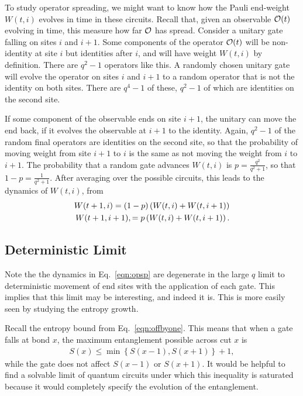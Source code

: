 
To study operator spreading, we might want to know how the Pauli end-weight $W(t,i)$ evolves in time in these circuits. Recall that, given an observable $\cal{O}(t)$ evolving in time, this measure how far $\cal{O}$ has spread. Consider a unitary gate falling on sites $i$ and $i+1$. Some components of the operator $\cal{O}(t)$ will be non-identity at site $i$ but identities after $i$, and will have weight $W(t, i)$ by definition. There are $q^2-1$ operators like this. A randomly chosen unitary gate will evolve the operator on sites $i$ and $i+1$ to a random operator that is not the identity on both sites. There are $q^4-1$ of these, $q^2-1$ of which are identities on the second site.

If some component of the observable ends on site $i+1$, the unitary can move the end back, if it evolves the observable at $i+1$ to the identity. Again, $q^2-1$ of the random final operators are identities on the second site, so that the probability of moving weight from site $i+1$ to $i$ is the same as not moving the weight from $i$ to $i+1$. The probability that a random gate advances $W(t,i)$ is $p = \frac{q^2}{q^2+1}$, so that $1-p = \frac{1}{q^2+1}$. After averaging over the possible circuits, this leads to the dynamics of $W(t,i)$, from~\cite{Keyserlingk}
\begin{align}
W(t+1, i) = (1-p)\left(W(t, i) + W(t, i+1)\right)\nn
W(t+1, i+1), = p\left(W(t, i) + W(t, i+1)\right). \label{eqn:opsp}
\end{align}

\subsection{Deterministic Limit}  \label{sub:determ}

Note the the dynamics in Eq.~\ref{eqn:opsp} are degenerate in the large $q$ limit to deterministic movement of end sites with the application of each gate. This implies that this limit may be interesting, and indeed it is. This is more easily seen by studying the entropy growth.

Recall the entropy bound from Eq.~\ref{eqn:offbyone}. This means that when a gate falls at bond $x$, the maximum entanglement possible across cut $x$ is 
\begin{align}
S(x) \le \min\left\lbrace S(x-1), S(x+1)\right\rbrace + 1, \nonumber
\end{align}
while the gate does not affect $S(x-1)$ or $S(x+1)$. It would be helpful to find a solvable limit of quantum circuits under which this inequality is saturated because it would completely specify the evolution of the entanglement. 


